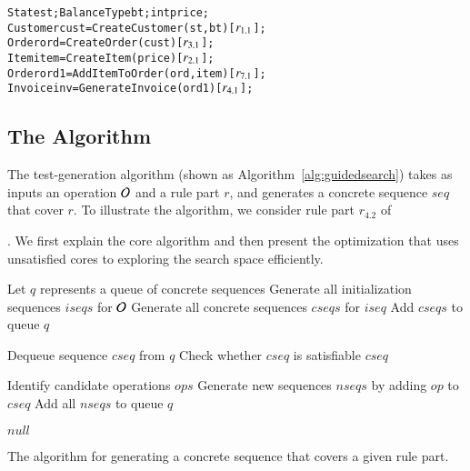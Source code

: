 \vspace*{-4pt}
{\scriptsize
\begin{alltt} 
 State st; BalanceType bt; int price;
 Customer cust = CreateCustomer(st, bt) [\(r\sb{1.1}\)];
 Order ord = CreateOrder(cust) [\(r\sb{3.1}\)];	
 Item item = CreateItem(price) [\(r\sb{2.1}\)];
 Order ord1 = AddItemToOrder(ord, item) [\(r\sb{7.1}\)];
 Invoice inv = GenerateInvoice(ord1) [\(r\sb{4.1}\)];  
\end{alltt}
}
\vspace*{-5pt}

\subsection{The Algorithm}
\label{sec:technique}

The test-generation algorithm (shown as Algorithm~\ref{alg:guidedsearch}) takes
as inputs an operation ${\cal O}$ and a rule part $r$, and generates a concrete
sequence $seq$ that cover $r$. To illustrate the algorithm, we consider rule
part $r_{4.2}$ of \subject{GenerateInvoice}.
We first explain the core algorithm and then present the optimization that uses
unsatisfied cores to exploring the search space efficiently.

\begin{algorithm}[t]
\footnotesize
\SetAlgoVlined
{}
\BlankLine

\nl Let $q$ represents a queue of concrete sequences\;
\nl Generate all initialization sequences $iseqs$ for ${\cal O}$\;
\nl {}
{
		\nl Generate all concrete sequences $cseqs$ for $iseq$\;
		\nl Add $cseqs$ to queue $q$\;
} 

\nl {}
{
		\nl Dequeue sequence $cseq$ from $q$\;
		\nl Check whether $cseq$ is satisfiable\;
		\nl {}
		{
				\Return $cseq$\;
		}
		
		\nl Identify candidate operations $ops$\;		
		\nl {}
		{
			\nl Generate new sequences $nseqs$ by adding $op$ to $cseq$\;
			\nl Add all $nseqs$ to queue $q$\;
		}
}

\Return $null$\;
		
\caption{\label{alg:guidedsearch} \small The algorithm for
  generating a concrete sequence that covers a given rule part.}
\end{algorithm}

